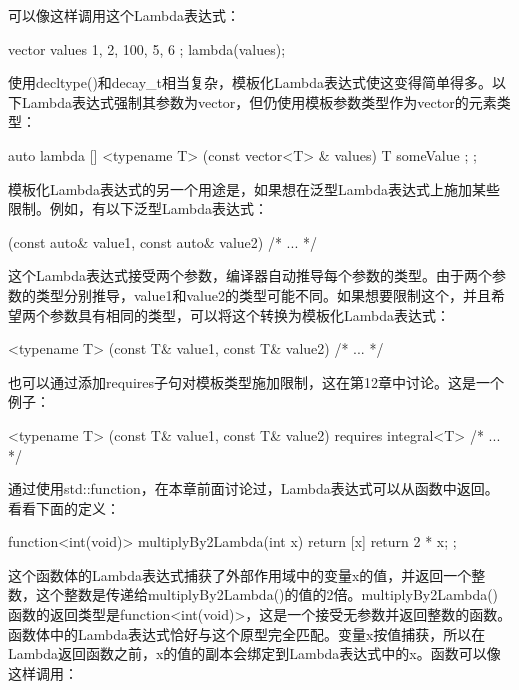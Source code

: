 可以像这样调用这个Lambda表达式：

\begin{cpp}
vector values { 1, 2, 100, 5, 6 };
lambda(values);
\end{cpp}

使用decltype()和decay\_t相当复杂，模板化Lambda表达式使这变得简单得多。以下Lambda表达式强制其参数为vector，但仍使用模板参数类型作为vector的元素类型：

\begin{cpp}
auto lambda { [] <typename T> (const vector<T> & values) {
        T someValue { };
} };
\end{cpp}

模板化Lambda表达式的另一个用途是，如果想在泛型Lambda表达式上施加某些限制。例如，有以下泛型Lambda表达式：

\begin{cpp}
[](const auto& value1, const auto& value2) { /* ... */ }
\end{cpp}

这个Lambda表达式接受两个参数，编译器自动推导每个参数的类型。由于两个参数的类型分别推导，value1和value2的类型可能不同。如果想要限制这个，并且希望两个参数具有相同的类型，可以将这个转换为模板化Lambda表达式：

\begin{cpp}
[] <typename T> (const T& value1, const T& value2) { /* ... */ }
\end{cpp}

也可以通过添加requires子句对模板类型施加限制，这在第12章中讨论。这是一个例子：

\begin{cpp}
[] <typename T> (const T& value1, const T& value2) requires integral<T> {/* ... */}
\end{cpp}


通过使用std::function，在本章前面讨论过，Lambda表达式可以从函数中返回。看看下面的定义：

\begin{cpp}
function<int(void)> multiplyBy2Lambda(int x)
{
    return [x]{ return 2 * x; };
}
\end{cpp}

这个函数体的Lambda表达式捕获了外部作用域中的变量x的值，并返回一个整数，这个整数是传递给multiplyBy2Lambda()的值的2倍。multiplyBy2Lambda()函数的返回类型是function<int(void)>，这是一个接受无参数并返回整数的函数。函数体中的Lambda表达式恰好与这个原型完全匹配。变量x按值捕获，所以在Lambda返回函数之前，x的值的副本会绑定到Lambda表达式中的x。函数可以像这样调用：

